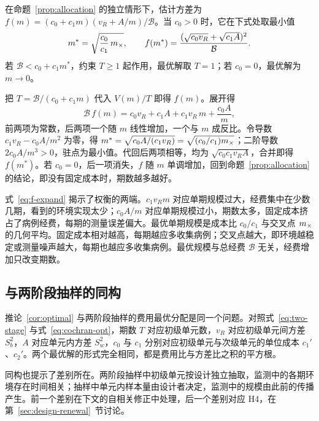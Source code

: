 \begin{corollary}[成本最优单期规模]
\label{cor:optimal}
在命题~\ref{prop:allocation} 的独立情形下，估计方差为 $f(m)=(c_0+c_1m)(v_R+A/m)/\mathcal B$。当 $c_0>0$ 时，它在下式处取最小值
\begin{equation}
  m^*=\sqrt{\frac{c_0}{c_1}\,m_{\times}},\qquad
  f(m^*)=\frac{(\sqrt{c_0v_R}+\sqrt{c_1A})^2}{\mathcal B}.
  \label{eq:optimal-m}
\end{equation}
若 $\mathcal B<c_0+c_1m^*$，约束 $T\geq1$ 起作用，最优解取 $T=1$；若 $c_0=0$，最优解为 $m\to0$。
\end{corollary}

把 $T=\mathcal B/(c_0+c_1m)$ 代入 $V(m)/T$ 即得 $f(m)$。展开得
\begin{equation}
  \mathcal B\,f(m)=c_0v_R+c_1A+c_1v_R\,m+\frac{c_0A}{m},
  \label{eq:f-expand}
\end{equation}
前两项为常数，后两项一个随 $m$ 线性增加，一个与 $m$ 成反比。令导数 $c_1v_R-c_0A/m^2$ 为零，得 $m^*=\sqrt{c_0A/(c_1v_R)}=\sqrt{(c_0/c_1)m_{\times}}$；二阶导数 $2c_0A/m^3>0$，驻点为最小值。代回后两项相等，均为 $\sqrt{c_0c_1v_RA}$，合并即得 $f(m^*)$。若 $c_0=0$，后一项消失，$f$ 随 $m$ 单调增加，回到命题~\ref{prop:allocation} 的结论，即没有固定成本时，期数越多越好。

式~\eqref{eq:f-expand} 揭示了权衡的两端。$c_1v_Rm$ 对应单期规模过大，经费集中在少数几期，看到的环境实现太少；$c_0A/m$ 对应单期规模过小，期数太多，固定成本挤占了病例经费，每期的测量误差偏大。最优单期规模是成本比 $c_0/c_1$ 与交叉点 $m_{\times}$ 的几何平均。固定成本相对越高，每期越应多收集病例；交叉点越大，即环境越稳定或测量噪声越大，每期也越应多收集病例。最优规模与总经费 $\mathcal B$ 无关，经费增加只改变期数。

\subsection{与两阶段抽样的同构}

推论~\ref{cor:optimal} 与两阶段抽样的费用最优分配是同一个问题\citep{cochran1977sampling}。对照式~\eqref{eq:two-stage} 与式~\eqref{eq:cochran-opt}，期数 $T$ 对应初级单元数，$v_R$ 对应初级单元间方差 $S_b^2$，$A$ 对应单元内方差 $S_w^2$，$c_0$ 与 $c_1$ 分别对应初级单元与次级单元的单位成本 $c_1'$、$c_2'$。两个最优解的形式完全相同，都是费用比与方差比之积的平方根。

同构也提示了差别所在。两阶段抽样中初级单元按设计独立抽取，监测中的各期环境存在时间相关；抽样中单元内样本量由设计者决定，监测中的规模由此前的传播产生。前一个差别在下文的自相关修正中处理，后一个差别对应 H4，在第~\ref{sec:design-renewal}~节讨论。

